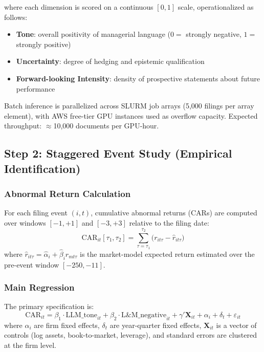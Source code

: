\documentclass[12pt]{article}
\begin{document}
where each dimension is scored on a continuous $[0,1]$ scale, operationalized
as follows:

\begin{itemize}[leftmargin=1.5em, noitemsep]
    \item \textbf{Tone}: overall positivity of managerial language ($0=$ strongly
    negative, $1=$ strongly positive)
    \item \textbf{Uncertainty}: degree of hedging and epistemic qualification
    \item \textbf{Forward-looking Intensity}: density of prospective statements
    about future performance
\end{itemize}

Batch inference is parallelized across SLURM job arrays (5,000 filings per
array element), with AWS free-tier GPU instances used as overflow capacity.
Expected throughput: $\approx$10,000 documents per GPU-hour.

\subsection{Step 2: Staggered Event Study (Empirical Identification)}

\subsubsection{Abnormal Return Calculation}

For each filing event $(i, t)$, cumulative abnormal returns (CARs) are computed
over windows $[-1,+1]$ and $[-3,+3]$ relative to the filing date:
\begin{equation}
    \text{CAR}_{it}[\tau_1, \tau_2] = \sum_{\tau=\tau_1}^{\tau_2}
    \bigl(r_{it\tau} - \hat{r}_{it\tau}\bigr)
\end{equation}
where $\hat{r}_{it\tau} = \hat{\alpha}_i + \hat{\beta}_i r_{mt\tau}$ is the
market-model expected return estimated over the pre-event window $[-250, -11]$.

\subsubsection{Main Regression}

The primary specification is:
\begin{equation}
    \text{CAR}_{it} = \beta_1 \cdot \text{LLM\_tone}_{it}
                    + \beta_2 \cdot \text{L\&M\_negative}_{it}
                    + \gamma' \mathbf{X}_{it}
                    + \alpha_i + \delta_t + \varepsilon_{it}
    \label{eq:main}
\end{equation}
where $\alpha_i$ are firm fixed effects, $\delta_t$ are year-quarter fixed
effects, $\mathbf{X}_{it}$ is a vector of controls (log assets, book-to-market,
leverage), and standard errors are clustered at the firm level.
\end{document}
